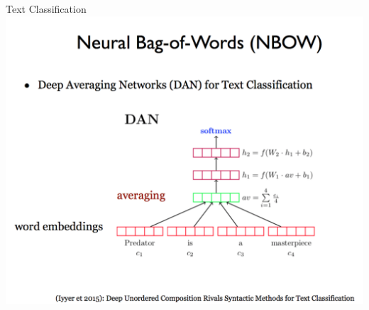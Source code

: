 \begin{frame}{Text Classification}
\centering
\includegraphics[scale=0.20]{figures/ff/nbow.png}
\end{frame}

